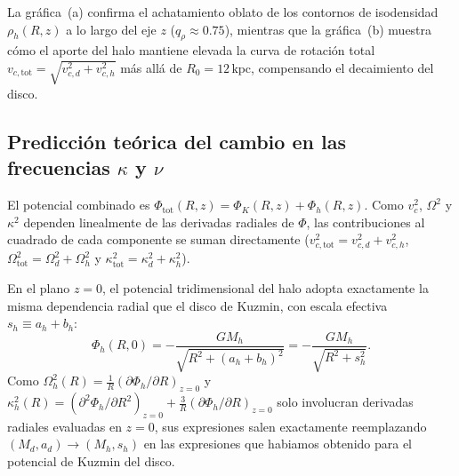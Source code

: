 \documentclass[11pt,letterpaper]{article}
\begin{document}
La gráfica~(a) confirma el achatamiento oblato de los contornos de isodensidad $\rho_h(R, z)$ a lo largo del eje $z$ ($q_\rho \approx 0.75$), mientras que la gráfica~(b) muestra cómo el aporte del halo mantiene elevada la curva de rotación total $v_{c,\mathrm{tot}} = \sqrt{v_{c,d}^2 + v_{c,h}^2}$ más allá de $R_0 = 12\,\mathrm{kpc}$, compensando el decaimiento del disco.

\subsection{Predicción teórica del cambio en las frecuencias \texorpdfstring{$\kappa$ y $\nu$}{kappa y nu}}

El potencial combinado es $\Phi_{\mathrm{tot}}(R,z) = \Phi_K(R,z) + \Phi_h(R,z)$. Como $v_c^2$, $\Omega^2$ y $\kappa^2$ dependen linealmente de las derivadas radiales de $\Phi$, las contribuciones al cuadrado de cada componente se suman directamente ($v_{c,\mathrm{tot}}^2 = v_{c,d}^2 + v_{c,h}^2$, $\Omega_{\mathrm{tot}}^2 = \Omega_d^2 + \Omega_h^2$ y $\kappa_{\mathrm{tot}}^2 = \kappa_d^2 + \kappa_h^2$).

En el plano $z = 0$, el potencial tridimensional del halo adopta exactamente la misma dependencia radial que el disco de Kuzmin, con escala efectiva $s_h \equiv a_h + b_h$:
\begin{equation}
    \Phi_h(R, 0) = -\frac{G M_h}{\sqrt{R^2 + (a_h + b_h)^2}} = -\frac{G M_h}{\sqrt{R^2 + s_h^2}}.
\end{equation}
Como $\Omega_h^2(R) = \frac{1}{R}(\partial\Phi_h/\partial R)_{z=0}$ y $\kappa_h^2(R) = (\partial^2\Phi_h/\partial R^2)_{z=0} + \frac{3}{R}(\partial\Phi_h/\partial R)_{z=0}$ solo involucran derivadas radiales evaluadas en $z = 0$, sus expresiones salen exactamente reemplazando $(M_d, a_d) \to (M_h, s_h)$ en las expresiones que habiamos obtenido para el potencial de Kuzmin del disco.
\end{document}
